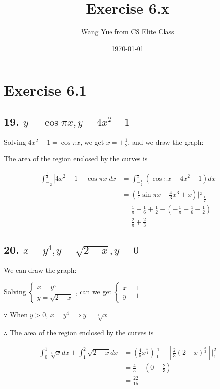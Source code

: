 \documentclass{article}
\begin{document}
    \title{Exercise 6.x}
    \author{Wang Yue from CS Elite Class}
    \date{\today}
    \maketitle

    \section*{Exercise 6.1}

    \subsection*{19. $y = \cos \pi x, y = 4x^2 - 1$}

    Solving $4x^2 - 1 = \cos \pi x$, we get $x =\pm \frac 1 2$, and we draw the graph:


    The area of the region enclosed by the curves is

    $$\begin{aligned}
        \int_{-\frac 1 2}^{\frac 1 2} |4x^2 - 1 - \cos \pi x| dx &= \int_{-\frac 1 2}^{\frac 1 2}(\cos \pi x - 4x^2 + 1) dx \\
        &= (\frac 1 \pi \sin \pi x - \frac{4}{3}x^3 + x)\biggl|_{-\frac 1 2}^{\frac 1 2} \\
        &= \frac{1}{\pi} - \frac{1}{6} + \frac 1 2 - (-\frac{1}{\pi} + \frac 1 6 - \frac 1 2) \\
        &= \frac 2 \pi + \frac 2 3
    \end{aligned}$$

    \subsection*{20. $x = y^4, y = \sqrt{2 - x}, y = 0$}

    We can draw the graph:


    Solving $\left\{ \begin{array}{ll}
        x = y^4 \\
        y = \sqrt{2 - x}
    \end{array} \right.$, can we get $\left\{ \begin{array}{ll}
        x = 1 \\
        y = 1
    \end{array} \right.$

    $\because$ When $y > 0$, $x = y^4 \implies y = \sqrt[4] x $

    $\therefore$ The area of the region enclosed by the curves is

    $$\begin{aligned}
        \int_0^1\sqrt[4]x dx + \int_1^2\sqrt{2 - x} dx &= (\frac{4}{5}x^{\frac 5 4})\biggl|_0^1 - [\frac{2}{3}(2 - x)^{\frac 3 2}]\biggl|_1^2 \\
        &= \frac 4 5 - (0 - \frac 2 3) \\
        &= \frac{22}{15}
    \end{aligned}$$
\end{document}
